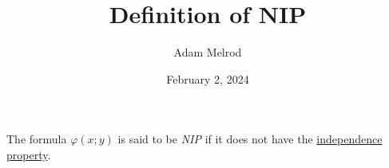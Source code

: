 \documentclass[a4paper]{article}
\title{Definition of NIP}
\date{February 2, 2024}
\author{Adam Melrod}
\begin{document}
\maketitle
\par{The formula \(\varphi (x;y)\) is said to be \emph{NIP} if it does not have
the \href{mon-0004}{independence property}.}
\printbibliography
\end{document}
